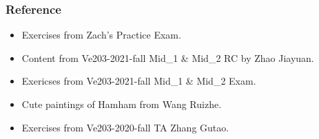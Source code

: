 \documentclass{beamer}
\begin{document}
\begin{frame}
    \frametitle{Reference}
    \begin{itemize}
        \item Exercises from Zach's Practice Exam.
        \item Content from Ve203-2021-fall Mid\_1 \& Mid\_2 RC by Zhao Jiayuan.
        \item Exericses from Ve203-2021-fall Mid\_1 \& Mid\_2 Exam.
        \item Cute paintings of Hamham from Wang Ruizhe.
        \item Exercises from Ve203-2020-fall TA Zhang Gutao.
    \end{itemize}
\end{frame}
\end{document}
